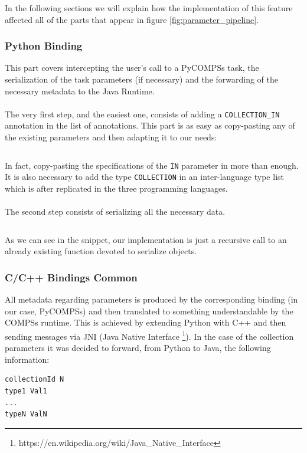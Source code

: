 In the following sections we will explain how the implementation of this feature affected all of the parts that appear in figure \ref{fig:parameter_pipeline}.

\subsubsection{Python Binding}
\label{subsubsec:python_binding_col_in}
This part covers intercepting the user's call to a PyCOMPSs task, the serialization of the task parameters (if necessary) and the forwarding of the necessary metadata to the Java Runtime.\\
\\
The very first step, and the easiest one, consists of adding a \verb|COLLECTION_IN| annotation in the list of annotations. This part is as easy as copy-pasting any of the existing parameters and then adapting it to our needs:

\inputminted{python}{snippets/param_col_in.py}

In fact, copy-pasting the specifications of the \verb|IN| parameter in more than enough. It is also necessary to add the type \verb|COLLECTION| in an inter-language type list which is after replicated in the three programming languages.\\
\\
The second step consists of serializing all the necessary data.

\inputminted{python}{snippets/serialize_object_into_file.py}

As we can see in the snippet, our implementation is just a recursive call to an already existing function devoted to serialize objects.

\subsubsection{C/C++ Bindings Common}
\label{subsubsec:bindings_common_col_in}
All metadata regarding parameters is produced by the corresponding binding (in our case, PyCOMPSs) and then translated to something understandable by the COMPSs runtime. This is achieved by extending Python with C++ and then sending messages via JNI (Java Native Interface \footnote{https://en.wikipedia.org/wiki/Java_Native_Interface}). In the case of the collection parameters it was decided to forward, from Python to Java, the following information:

\begin{verbatim}
collectionId N
type1 Val1
...
typeN ValN
\end{verbatim}

